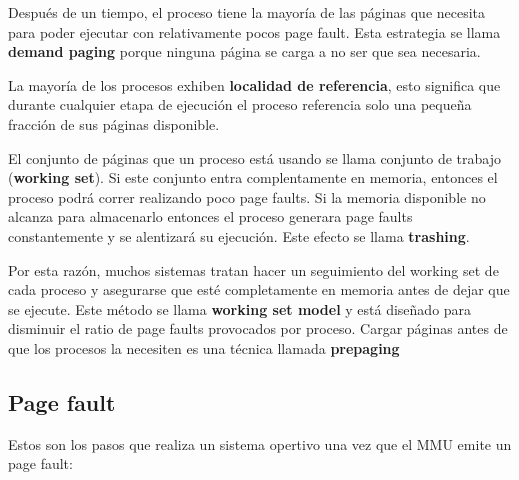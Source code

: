 Después de un tiempo, el proceso tiene la mayoría de las páginas que necesita para poder ejecutar con relativamente pocos page fault. Esta estrategia se llama \textbf{demand paging} porque ninguna página se carga a no ser que sea necesaria.

La mayoría de los procesos exhiben \textbf{localidad de referencia}, esto significa que durante cualquier etapa de ejecución el proceso referencia solo una pequeña fracción de sus páginas disponible. 

El conjunto de páginas que un proceso está usando se llama conjunto de trabajo (\textbf{working set}). Si este conjunto entra complentamente en memoria, entonces el proceso podrá correr realizando poco page faults. Si la memoria disponible no alcanza para almacenarlo entonces el proceso generara page faults constantemente y se alentizará su ejecución. Este efecto se llama \textbf{trashing}.

Por esta razón, muchos sistemas tratan hacer un seguimiento del working set de cada proceso y asegurarse que esté completamente en memoria antes de dejar que se ejecute. Este método se llama \textbf{working set model} y está diseñado para disminuir el ratio de page faults provocados por proceso. Cargar páginas antes de que los procesos la necesiten es una técnica llamada \textbf{prepaging}

\subsection{Page fault}\label{page-fault}
Estos son los pasos que realiza un sistema opertivo una vez que el MMU emite un page fault:

